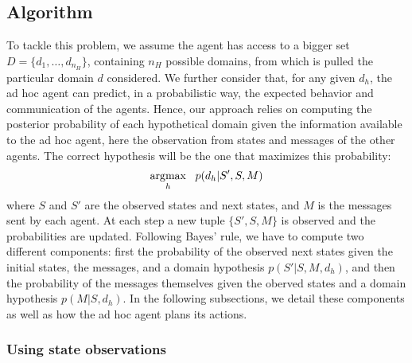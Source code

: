 \subsection{Algorithm}

To tackle this problem, we assume the agent has access to a bigger set $D = \{d_1, \ldots, d_{n_H}\}$, containing $n_H$ possible domains, from which is pulled the particular domain $d$ considered. We further consider that, for any given $d_h$, the ad hoc agent can predict, in a probabilistic way, the expected behavior and communication of the agents. Hence, our approach relies on computing the posterior probability of each hypothetical domain given the information available to the ad hoc agent, here the observation from states and messages of the other agents. The correct hypothesis will be the one that maximizes this probability:
%
\begin{eqnarray}
\operatorname*{\arg\!\max}_h~~p(d_h|S',S,M)  \label{eq:problem}
\end{eqnarray}
%
where $S$ and $S'$ are the observed states and next states, and $M$ is the messages sent by each agent. At each step a new tuple $\{S', S, M\}$ is observed and the probabilities are updated. Following Bayes' rule, we have to compute two different components: first the probability of the observed next states given the initial states, the messages, and a domain hypothesis $p(S'|S,M,d_h)$, and then the probability of the messages themselves given the oberved states and a domain hypothesis $p(M|S,d_h)$. In the following subsections, we detail these components as well as how the ad hoc agent plans its actions.%

\subsubsection{Using state observations}

